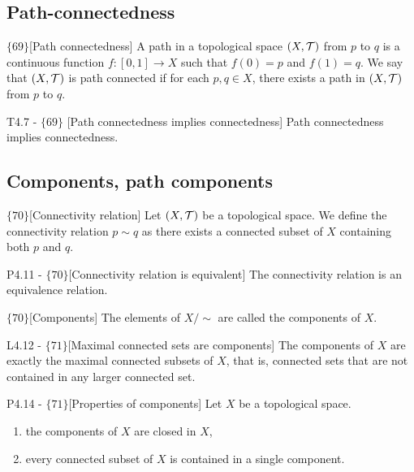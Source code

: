 \documentclass{article}
\begin{document}
\subsection{Path-connectedness}

\begin{flexidefinition}{$\{69\}$}[Path connectedness]
    A path in a topological space $(X,\mathcal{T})$ from $p$ to $q$ is a continuous function $f: [0,1] \to X$ such that $f(0) = p$ and $f(1) = q$. We say that $(X,\mathcal{T})$ is path connected if for each $p,q \in X$, there exists a path in $(X,\mathcal{T})$ from $p$ to $q$.
\end{flexidefinition}

\begin{flexitheorem}{T4.7 - $\{69\}$ }[Path connectedness implies connectedness]
    Path connectedness implies connectedness.
\end{flexitheorem}

\subsection{Components, path components}
\begin{flexidefinition}{$\{70\}$}[Connectivity relation]
    Let $(X,\mathcal{T})$ be a topological space. We define the connectivity relation $p \sim q$ as there exists a connected subset of $X$ containing both $p$ and $q$.
\end{flexidefinition}

\begin{flexilemma}{P4.11 - $\{70\}$}[Connectivity relation is equivalent]
    The connectivity relation is an equivalence relation.
\end{flexilemma}

\begin{flexidefinition}{$\{70\}$}[Components]
    The elements of $X / \sim$ are called the components of $X$.
\end{flexidefinition}

\begin{flexilemma}{L4.12 - $\{71\}$}[Maximal connected sets are components]
    The components of $X$ are exactly the maximal connected subsets of $X$, that is, connected sets that are not contained in any larger connected set.
\end{flexilemma}

\begin{flexilemma}{P4.14 - $\{71\}$}[Properties of components]
    Let $X$ be a topological space. 
    \begin{enumerate}[label = (\alph*)]
        \item the components of $X$ are closed in $X$,
        \item every connected subset of $X$ is contained in a single component.
    \end{enumerate}
\end{flexilemma}
\end{document}
